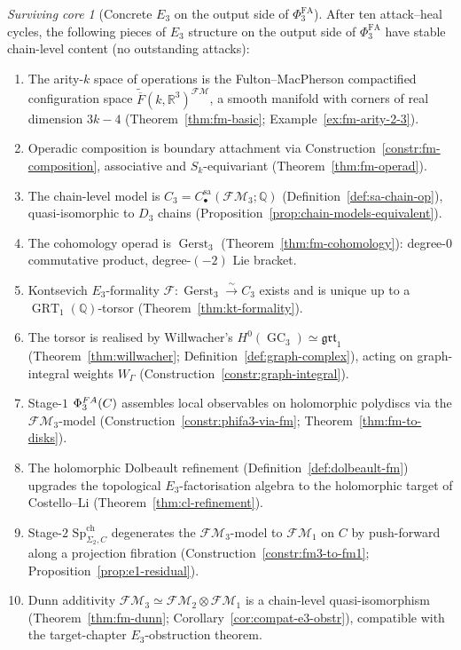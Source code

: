 \documentclass[11pt]{article}
\theoremstyle{definition}
\theoremstyle{remark}
\newtheorem{survivor}[theorem]{Surviving core}
\DeclareMathOperator{\Gerst}{Gerst}
\DeclareMathOperator{\GC}{GC}
\DeclareMathOperator{\GRT}{GRT}
\newcommand{\FMbar}{\overline{F}}
\newcommand{\FM}{\mathcal{FM}}
\newcommand{\Ddisk}{D}
\newcommand{\PhiFA}{\Phi^{\mathrm{FA}}}
\newcommand{\SpCh}{\mathrm{Sp}^{\mathrm{ch}}}
\begin{document}
\begin{survivor}[Concrete $E_3$ on the output side of $\PhiFA_3$]
\label{sur:core}
After ten attack--heal cycles, the following pieces of $E_3$
structure on the output side of $\PhiFA_3$ have stable chain-level
content (no outstanding attacks):
\begin{enumerate}[label=(S\arabic*), leftmargin=*]
 \item\label{S1} The arity-$k$ space of operations is the
      Fulton--MacPherson compactified configuration space
      $\widetilde{\FMbar}(k, \mathbb{R}^3)^{\FM}$, a smooth manifold
      with corners of real dimension $3k - 4$ (Theorem~\ref{thm:fm-basic};
      Example~\ref{ex:fm-arity-2-3}).
 \item\label{S2} Operadic composition is boundary attachment via
       Construction~\ref{constr:fm-composition}, associative and
       $S_k$-equivariant (Theorem~\ref{thm:fm-operad}).
 \item\label{S3} The chain-level model is
       $C_3 = C^{\mathrm{sa}}_\bullet(\FM_3; \mathbb{Q})$ (Definition~\ref{def:sa-chain-op}),
       quasi-isomorphic to $\Ddisk_3$ chains (Proposition~\ref{prop:chain-models-equivalent}).
 \item\label{S4} The cohomology operad is $\Gerst_3$
       (Theorem~\ref{thm:fm-cohomology}): degree-$0$ commutative product,
       degree-$(-2)$ Lie bracket.
 \item\label{S5} Kontsevich $E_3$-formality $\mathcal{F} \colon
       \Gerst_3 \xrightarrow{\sim} C_3$ exists and is unique up to a
       $\GRT_1(\mathbb{Q})$-torsor (Theorem~\ref{thm:kt-formality}).
 \item\label{S6} The torsor is realised by Willwacher's
       $H^0(\GC_3) \simeq \mathfrak{grt}_1$
       (Theorem~\ref{thm:willwacher}; Definition~\ref{def:graph-complex}),
       acting on graph-integral weights $W_\Gamma$ (Construction~\ref{constr:graph-integral}).
 \item\label{S7} Stage-$1$ $\PhiFA_3(\cC)$ assembles local observables
       on holomorphic polydiscs via the $\FM_3$-model
       (Construction~\ref{constr:phifa3-via-fm};
       Theorem~\ref{thm:fm-to-disks}).
 \item\label{S8} The holomorphic Dolbeault refinement
       (Definition~\ref{def:dolbeault-fm}) upgrades the topological
       $E_3$-factorisation algebra to the holomorphic target of
       Costello--Li (Theorem~\ref{thm:cl-refinement}).
 \item\label{S9} Stage-$2$ $\SpCh_{\Sigma_2, C}$ degenerates the
       $\FM_3$-model to $\FM_1$ on $C$ by push-forward along a
       projection fibration (Construction~\ref{constr:fm3-to-fm1};
       Proposition~\ref{prop:e1-residual}).
 \item\label{S10} Dunn additivity $\FM_3 \simeq \FM_2 \otimes \FM_1$
       is a chain-level quasi-isomorphism (Theorem~\ref{thm:fm-dunn};
       Corollary~\ref{cor:compat-e3-obstr}), compatible with the
       target-chapter $E_3$-obstruction theorem.
\end{enumerate}
\end{survivor}
\end{document}
